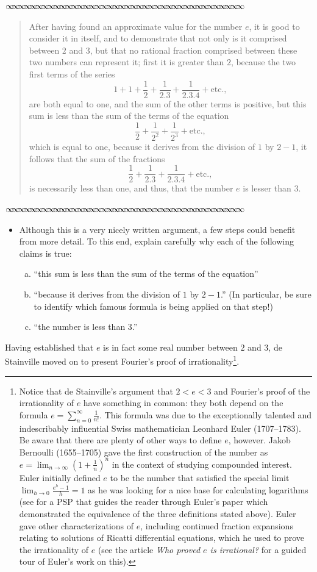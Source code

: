 \documentclass[11pt]{article}
\newcommand{\sep}{\vspace{-3pt}
\begin{center}
{\mathversion{normal}
$\infty \mspace{-5.5mu}\infty \mspace{-5.5mu}\infty \mspace{-5.5mu}\infty \mspace{-5.5mu}
\infty \mspace{-5.5mu}\infty \mspace{-5.5mu}\infty \mspace{-5.5mu}\infty \mspace{-5.5mu}
\infty \mspace{-5.5mu}\infty \mspace{-5.5mu}\infty \mspace{-5.5mu}\infty \mspace{-5.5mu}
\infty \mspace{-5.5mu}\infty \mspace{-5.5mu}\infty \mspace{-5.5mu}\infty \mspace{-5.5mu}
\infty \mspace{-5.5mu}\infty \mspace{-5.5mu}\infty \mspace{-5.5mu}\infty \mspace{-5.5mu}
\infty \mspace{-5.5mu}\infty \mspace{-5.5mu}\infty \mspace{-5.5mu}\infty \mspace{-5.5mu}
\infty \mspace{-5.5mu}\infty \mspace{-5.5mu}\infty \mspace{-5.5mu}\infty \mspace{-5.5mu}
\infty \mspace{-5.5mu}\infty \mspace{-5.5mu}\infty \mspace{-5.5mu}\infty \mspace{-5.5mu}
\infty \mspace{-5.5mu}\infty \mspace{-5.5mu}\infty \mspace{-5.5mu}\infty \mspace{-5.5mu}
\infty \mspace{-5.5mu}\infty \mspace{-5.5mu}\infty \mspace{-5.5mu}\infty \mspace{-5.5mu}$}
\end{center} \vspace*{-5pt}}
\newenvironment{source}%
 {\bigskip \sep \vspace*{-6pt} \begin{quote}
          \begin{sf}   }
   {   \end{sf}     \end{quote} \vspace*{-6pt} \sep \bigskip}%
\newcounter{tasknumb}
\newcommand{\tasknumb}[1]{\refstepcounter{tasknumb}\textmd{\textbf{$\fbox{$\fbox{Task \thetasknumb}$}$}}#1}
\newenvironment{task}[1][]%
 {\begin{itemize}
 \item[\tasknumb{#1}]  }
{
    \end{itemize}    }%
\begin{document}
\begin{source}
After having found an approximate value for the number $e$, it is good to consider it in itself, and to demonstrate that not only is it comprised between $2$ and $3$, but that no rational fraction comprised between these two numbers can represent it; first it is greater than $2$, because the two first terms of the series
$$1+1+\frac{1}{2}+\frac{1}{2.3}+\frac{1}{2.3.4}+\text{etc.}, $$ are both equal to one, and the sum of the other terms is positive, but this sum is less than the sum of the terms of the equation $$\frac{1}{2}+\frac{1}{2^2}+\frac{1}{2^3}+\text{etc.},$$ which is equal to one, because it derives from the division of $1$ by $2-1$, it follows that the sum of the fractions $$\frac{1}{2}+\frac{1}{2.3}+\frac{1}{2.3.4}+\text{etc.}, $$ is necessarily less than one, and thus, that the number $e$ is lesser than 3.
\end{source}

\begin{task}
Although this is a very nicely written argument, a few steps could benefit from more detail.  To this end, explain carefully why each of the following claims is true: 
\begin{enumerate}[(a)]
    \item ``{\sf this sum is less than the sum of the terms of the equation}''  
    \item ``{\sf because it derives from the division of $1$ by $2-1$.}'' (In particular, be sure to identify which famous formula is being applied on that step!)
     
    \item ``{\sf the number is less than $3$.}''
\end{enumerate}
\end{task}

Having established that $e$ is in fact some real number between $2$ and $3$, de Stainville moved on to present Fourier's proof of irrationality\footnote{Notice that de Stainville's argument that $2<e<3$ and Fourier's proof of the irrationality of $e$ have something in common: they both depend on the formula $e=\sum_{n=0}^\infty \frac{1}{n!}$. This formula was due to the exceptionally talented and indescribably influential Swiss mathematician Leonhard Euler (1707--1783).  Be aware that there are plenty of other ways to define $e$, however. Jakob Bernoulli (1655--1705) gave the first construction of the number as $e=\lim_{n\to \infty}\left(1+\frac{1}{n}\right)^n$ in the context of studying compounded interest.  Euler initially defined $e$ to be the number that satisfied the special limit $\lim_{h\to 0 }\frac{e^h-1}{h}=1$ as he was looking for a nice base for calculating logarithms (see \citep{Ruch} for a PSP that guides the reader through Euler's paper which demonstrated the equivalence of the three definitions stated above).  Euler gave other characterizations of $e$, including continued fraction expansions relating to solutions of Ricatti differential equations, which he used to prove the irrationality of $e$ (see the article \emph{Who proved $e$ is irrational?} \citep{Sandifer} for a guided tour of Euler's work on this). }.
\end{document}
